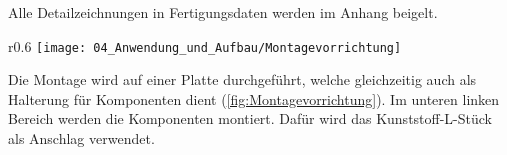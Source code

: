 	\begin{bfhNoteBox}
		Alle Detailzeichnungen in Fertigungsdaten werden im Anhang beigelt. 
	\end{bfhNoteBox}	
	
	\vspace{5mm} 
	\begin{wrapfigure}{r}{0.6\textwidth}
		\centering
		\texttt{[image: 04\_Anwendung\_und\_Aufbau/Montagevorrichtung]}
		\captionsetup{justification=centering}
		\caption{Montagevorrichtung}
		\label{fig:Montagevorrichtung}
	\end{wrapfigure} \par
	Die Montage wird auf einer Platte durchgeführt, welche gleichzeitig auch als Halterung für Komponenten dient (\ref{fig:Montagevorrichtung}). Im unteren linken Bereich werden die Komponenten montiert. Dafür wird das Kunststoff-L-Stück als Anschlag verwendet. 
	
	